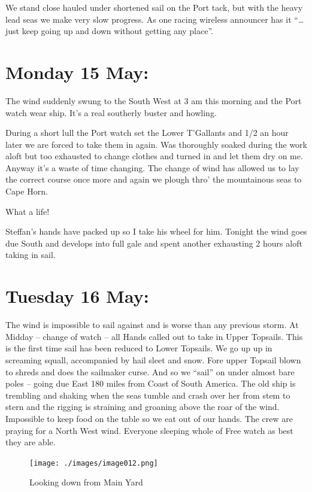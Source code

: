 \documentclass[
  11pt,
  msmallroyalvopaper
]{memoir}
\begin{document}
We stand close hauled under shortened sail on the Port tack, but with
the heavy lead seas we make very slow progress. As one racing wireless
announcer has it ``\ldots{} just keep going up and down without getting
any place''.

\hypertarget{monday-15-may}{%
\section{Monday 15 May:}\label{monday-15-may}}

The wind suddenly swung to the South West at 3 am this morning and the
Port watch wear ship. It's a real southerly buster and howling.

During a short lull the Port watch set the Lower T'Gallants and 1/2 an
hour later we are forced to take them in again. Was thoroughly soaked
during the work aloft but too exhausted to change clothes and turned in
and let them dry on me. Anyway it's a waste of time changing. The change
of wind has allowed us to lay the correct course once more and again we
plough thro' the mountainous seas to Cape Horn.

What a life!

Steffan's hands have packed up so I take his wheel for him. Tonight the
wind goes due South and develops into full gale and spent another
exhausting 2 hours aloft taking in sail.

\hypertarget{tuesday-16-may}{%
\section{Tuesday 16 May:}\label{tuesday-16-may}}

The wind is impossible to sail against and is worse than any previous
storm. At Midday -- change of watch -- all Hands called out to take in
Upper Topsails. This is the first time sail has been reduced to Lower
Topsails. We go up up in screaming squall, accompanied by hail sleet and
snow. Fore upper Topsail blown to shreds and does the sailmaker curse.
And so we ``sail'' on under almost bare poles -- going due East 180
miles from Coast of South America. The old ship is trembling and shaking
when the seas tumble and crash over her from stem to stern and the
rigging is straining and groaning above the roar of the wind. Impossible
to keep food on the table so we eat out of our hands. The crew are
praying for a North West wind. Everyone sleeping whole of Free watch as
best they are able.

\begin{figure}
\centering
\texttt{[image: ./images/image012.png]}
\caption{Looking down from Main Yard}
\end{figure}
\end{document}
